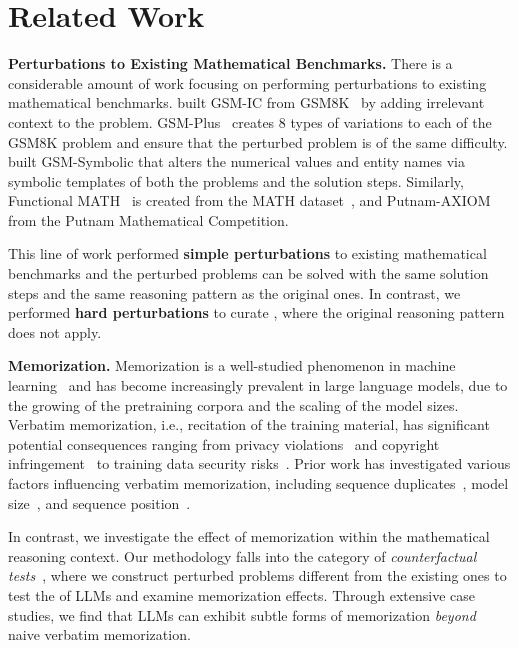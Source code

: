 \section{Related Work}


\textbf{Perturbations to Existing Mathematical Benchmarks.} There is a considerable amount of work focusing on performing perturbations to existing mathematical benchmarks.  
\citet{shi2023large} built GSM-IC from GSM8K~\citep{cobbe2021training} by adding irrelevant context to the problem. GSM-Plus~\citep{li2024gsm} creates 8 types of variations to each of the GSM8K problem and ensure that the perturbed problem is of the same difficulty.
\citet{mirzadeh2024gsm} built GSM-Symbolic that alters the numerical values and entity names via symbolic templates of both the problems and the solution steps. 
Similarly, Functional MATH~\citep{srivastava2024functional} is created from the MATH dataset~\citep{hendrycksmath2021}, and Putnam-AXIOM~\citep{gulati2024putnamaxiom} from the Putnam Mathematical Competition. 


This line of work performed \textbf{simple perturbations} to existing mathematical benchmarks and the perturbed problems can be solved with the same solution steps and the same reasoning pattern as the original ones. In contrast, we performed \textbf{hard perturbations} to curate \HARD, where the original reasoning pattern does not apply.








\textbf{Memorization.} Memorization is a well-studied phenomenon in machine learning~\citep{feldman2020neural, zhang2021understanding, feldman2020does} and has become increasingly prevalent in large language models, due to the growing of the pretraining corpora and the scaling of the model sizes. 
Verbatim memorization, i.e., recitation of the training material, has significant potential consequences ranging from privacy violations~\citep{carlini2022privacy, brown2022does,huang2023privacy} and copyright infringement~\citep{shi2023detecting, karamolegkou2023copyright, wei2024evaluating, chen2024copybench} to training data security risks~\citep{carlini2021extracting, nasr2023scalable}.
Prior work has investigated various factors influencing verbatim memorization, including sequence duplicates~\citep{lee2021deduplicating, hernandez2022scaling}, model size~\citep{tirumala2022memorization}, and sequence position~\citep{biderman2023pythia}. 


In contrast, we investigate the effect of memorization within the mathematical reasoning context. Our methodology falls into the category of \textit{counterfactual tests}~\citep{zhang2023counterfactual, wu2023reasoning, zheng2023large,  xie2024memorization}, where we construct perturbed problems different from the existing ones to test the  of LLMs and examine memorization effects.
Through extensive case studies, we find that LLMs can exhibit subtle forms of memorization \textit{beyond} naive verbatim memorization.





